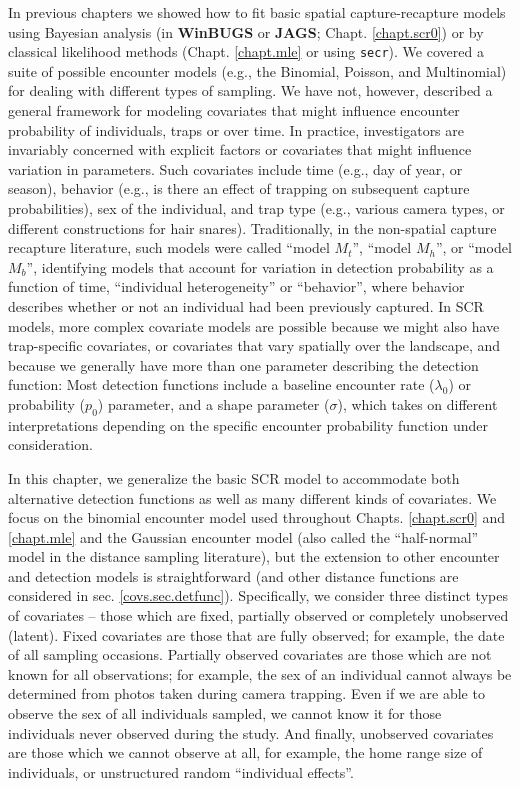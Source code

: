 In previous chapters we showed how to fit basic spatial
capture-recapture models using Bayesian analysis (in {\bf WinBUGS} or
{\bf JAGS};
Chapt. \ref{chapt.scr0}) or by classical likelihood methods
(Chapt. \ref{chapt.mle} or using \mbox{\tt secr}). We covered a suite of possible encounter models
(e.g., the Binomial, Poisson, and Multinomial) for
dealing with different types of sampling. We have not, however,
described a general framework for modeling covariates that might
influence encounter probability of individuals, traps or over time.
In practice, 
investigators are invariably concerned
with explicit factors or covariates that might influence variation in
parameters. Such covariates
include time (e.g., day of year, or season), behavior (e.g., is there an 
effect of trapping on subsequent capture probabilities), sex of the individual, and trap
type (e.g., various camera types, or different constructions for hair
snares). Traditionally, in the non-spatial capture recapture
literature, such models were called ``model $M_t$'', ``model
$M_h$'', or ``model $M_b$'', identifying models that account for
variation in detection probability as a function of time, ``individual
heterogeneity'' or ``behavior'', where behavior describes
whether or not an individual had been previously captured. In SCR
models, more complex covariate models are possible because we might
also have trap-specific covariates, or covariates that vary spatially
over the landscape, and because we generally have more than one 
parameter describing the detection function:
Most detection functions include a baseline encounter
rate ($\lambda_0$) or probability ($p_0$) parameter, and a shape parameter
($\sigma$), which takes on different interpretations depending on
the specific encounter probability function under consideration. 

In this chapter, we generalize the basic SCR model to accommodate both 
alternative detection functions as well as
many different kinds of covariates. We focus on the binomial encounter
model used throughout Chapts. \ref{chapt.scr0} and \ref{chapt.mle} and
the Gaussian encounter model (also called the ``half-normal'' model in
the distance sampling literature), 
but the extension to other encounter and detection models is
straightforward (and other distance functions are considered in sec. \ref{covs.sec.detfunc}). 
Specifically, we consider three distinct types of
covariates -- those which are fixed, partially observed or completely
unobserved (latent).  Fixed covariates are those that are fully
observed; for example, the date of all sampling occasions.  Partially
observed covariates are those which are not known for all
observations; for example, the sex of an individual cannot always be
determined from photos taken during camera trapping.  Even if we are
able to observe the sex of all individuals sampled, we cannot know it
for those individuals never observed during the study.  And finally,
unobserved covariates are those which we cannot observe at all, for
example, the home range size of individuals, or unstructured random
``individual effects''.


